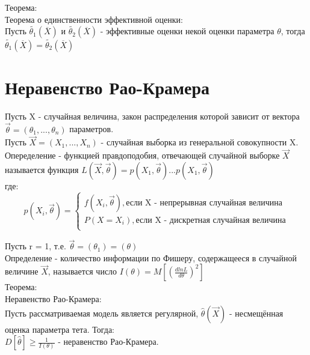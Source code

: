 Теорема:\\
Теорема о единственности эффективной оценки:\\
Пусть $\tilde{\theta_{1}}(\overline{X})$ и $\tilde{\theta_{2}}(\overline{X})$ - эффективные оценки некой оценки параметра $\theta$, тогда $\tilde{\theta_{1}}(\overline{X}) = \tilde{\theta_{2}}(\overline{X})$

\section{Неравенство Рао-Крамера}
Пусть X - случайная величина, закон распределения которой зависит от вектора $\overrightarrow{\theta} = (\theta_{1}, ..., \theta_{n})$ параметров.\\
Пусть $\overrightarrow{X} = (X_{1}, ..., X_{n})$ - случайная выборка из генеральной совокупности X.\\

Опеределение - функцией правдоподобия, отвечающей случайной выборке  $\overrightarrow{X}$ называется функция $L(\overrightarrow{X}, \overrightarrow{\theta}) = p(X_{1}, \overrightarrow{\theta}) ... p(X_{1}, \overrightarrow{\theta})$\\
где:\\
\begin{equation}
p(X_{i}, \overrightarrow{\theta}) = 
\begin{cases}
f(X_{i}, \overrightarrow{\theta}), \text{если X - непрерывная случайная величина}\\
P(X = X_{i}), \text{если X - дискретная случайная величина}\\
\end{cases}
\end{equation}

Пусть r = 1, т.е. $\overrightarrow{\theta} = (\theta_{1}) = (\theta)$\\

Определение - количество информации по Фишеру, содержащееся в случайной величине $\overrightarrow{X}$, называется число $I(\theta) = M[(\frac{d ln L}{d\theta})^{2}]$\\

Теорема:\\
Неравенство Рао-Крамера:\\
Пусть рассматриваемая модель является регулярной, $\hat{\theta}(\overrightarrow{X})$ - несмещённая оценка параметра тета. Тогда:\\
$D[\hat{\theta}] \geqslant \frac{1}{I(\theta)}$ - неравенство Рао-Крамера.\\

